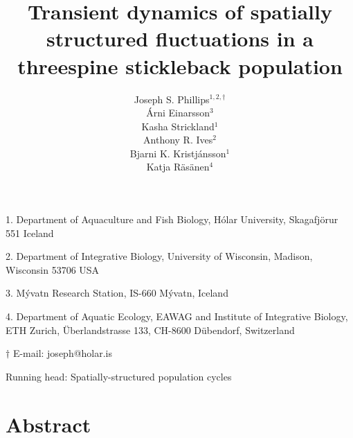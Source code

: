 \documentclass[11pt]{article}
\title{Transient dynamics of spatially structured fluctuations 
in a threespine stickleback population}
\author{
Joseph S. Phillips$^{1,2, \dagger}$ \\
\'{A}rni Einarsson$^{3}$ \\ 
Kasha Strickland$^{1}$ \\
Anthony R. Ives$^{2}$ \\
Bjarni K. Kristj\'{a}nsson$^{1}$ \\
Katja R\"{a}s\"{a}nen$^{4}$ 
}
\date{}
\begin{document}
\raggedright
\setlength\parindent{0.25in}

\maketitle


\noindent{} 1. Department of Aquaculture and Fish Biology, 
H\'{o}lar University, Skagafj\"{o}r{\dh}ur 551 Iceland

\noindent{} 2. Department of Integrative Biology, 
University of Wisconsin, Madison, Wisconsin 53706 USA

\noindent{} 3. M\'{y}vatn Research Station, IS-660 M\'{y}vatn, Iceland

\noindent{} 4. Department of Aquatic Ecology, EAWAG and 
Institute of Integrative Biology, ETH Zurich, 
\"{U}berlandstrasse 133, CH-8600 D\"{u}bendorf, Switzerland

\noindent{} $\dagger$ E-mail: joseph@holar.is



\bigskip

Running head: {Spatially-structured population cycles}

\linenumbers{}

\clearpage






\section*{Abstract} \label{abstract}
\end{document}
